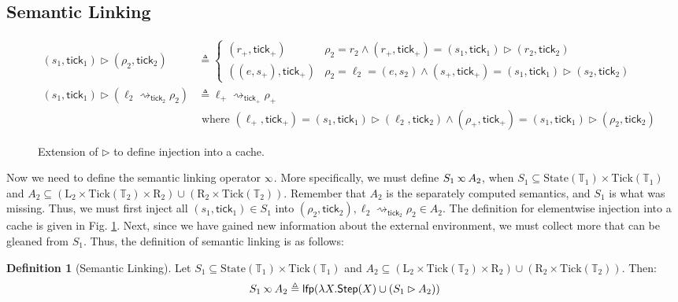 \documentclass[acmsmall,review]{acmart}\settopmatter{printfolios=true,printccs=false,printacmref=false}
\theoremstyle{definition}
\newtheorem{definition}{Definition}[section]
\newcommand*{\Time}{\mathbb{T}}
\newcommand*{\Left}{\text{L}}
\newcommand*{\Right}{\text{R}}
\newcommand*{\State}{\text{State}}
\newcommand*{\Tick}{\text{Tick}}
\newcommand*{\semlink}{\mathbin{\rotatebox[origin=c]{180}{$\propto$}}}
\newcommand*{\tick}{\mathsf{tick}}
\begin{document}
\subsection{Semantic Linking}
\begin{figure}[h!]
  \footnotesize
  \begin{align*}
    (s_1,\tick_1)\rhd(\rho_2,\tick_2)                         & \triangleq
    \begin{cases}
      (r_+,\tick_+)     & \rho_2=r_2\wedge(r_+,\tick_+)=(s_1,\tick_1)\rhd(r_2,\tick_2)            \\
      ((e,s_+),\tick_+) & \rho_2=\ell_2=(e,s_2)\wedge(s_+,\tick_+)=(s_1,\tick_1)\rhd(s_2,\tick_2)
    \end{cases} \\
    (s_1,\tick_1)\rhd(\ell_2\rightsquigarrow_{\tick_2}\rho_2) & \triangleq
    \ell_+\rightsquigarrow_{\tick_+}\rho_+                                                      \\
                                                              & \text{ where }
    (\ell_+,\tick_+)=(s_1,\tick_1)\rhd(\ell_2,\tick_2)\wedge
    (\rho_+,\tick_+)=(s_1,\tick_1)\rhd(\rho_2,\tick_2)
  \end{align*}
  \caption{Extension of $\rhd$ to define injection into a cache.}
  \label{fig:extinject}
\end{figure}
Now we need to define the semantic linking operator $\semlink$.
More specifically, we must define $S_1\semlink A_2$, when $S_1\subseteq\State(\Time_1)\times\Tick(\Time_1)$ and $A_2\subseteq(\Left_2\times\Tick(\Time_2)\times\Right_2)\cup(\Right_2\times\Tick(\Time_2))$.
Remember that $A_2$ is the separately computed semantics, and $S_1$ is what was missing.
Thus, we must first inject all $(s_1,\tick_1)\in S_1$ into $(\rho_2,\tick_2),\ell_2\rightsquigarrow_{\tick_2}\rho_2\in A_2$.
The definition for elementwise injection into a cache is given in Fig. \ref{fig:extinject}.
Next, since we have gained new information about the external environment, we must collect more that can be gleaned from $S_1$.
Thus, the definition of semantic linking is as follows:
\begin{definition}[Semantic Linking]
  Let $S_1\subseteq\State(\Time_1)\times\Tick(\Time_1)$ and $A_2\subseteq(\Left_2\times\Tick(\Time_2)\times\Right_2)\cup(\Right_2\times\Tick(\Time_2))$.
  Then:
  \[
    S_1\semlink A_2\triangleq
    \mathsf{lfp}(\lambda X.\mathsf{Step}(X)\cup(S_1\rhd A_2))
  \]
\end{definition}
\end{document}
